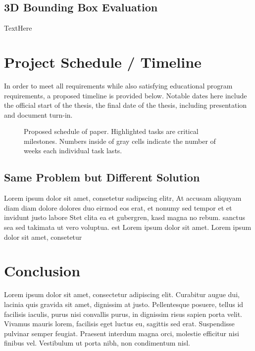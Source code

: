 \subsection{3D Bounding Box Evaluation}
TextHere

\section{Project Schedule / Timeline}
In order to meet all requirements while also satisfying educational program requirements, a proposed timeline is provided below. Notable dates here include the official start of the thesis, the final date of the thesis, including presentation and document turn-in.

\begin{figure}[h] %
    \caption{Proposed schedule of paper. Highlighted tasks are critical milestones. Numbers inside of gray cells indicate the number of weeks each individual task lasts.}
\end{figure}


\subsection{Same Problem but Different Solution}
Lorem ipsum dolor sit amet, consetetur sadipscing elitr, At accusam aliquyam diam diam dolore dolores duo eirmod eos erat, et nonumy sed tempor et et invidunt justo labore Stet clita ea et gubergren, kasd magna no rebum. sanctus sea sed takimata ut vero voluptua. est Lorem ipsum dolor sit amet. Lorem ipsum dolor sit amet, consetetur\\
\section{Conclusion}
 Lorem ipsum dolor sit amet, consectetur adipiscing elit. Curabitur augue dui, lacinia quis gravida sit amet, dignissim at justo. Pellentesque posuere, tellus id facilisis iaculis, purus nisi convallis purus, in dignissim risus sapien porta velit. Vivamus mauris lorem, facilisis eget luctus eu, sagittis sed erat. Suspendisse pulvinar semper feugiat. Praesent interdum magna orci, molestie efficitur nisi finibus vel. Vestibulum ut porta nibh, non condimentum nisl.
